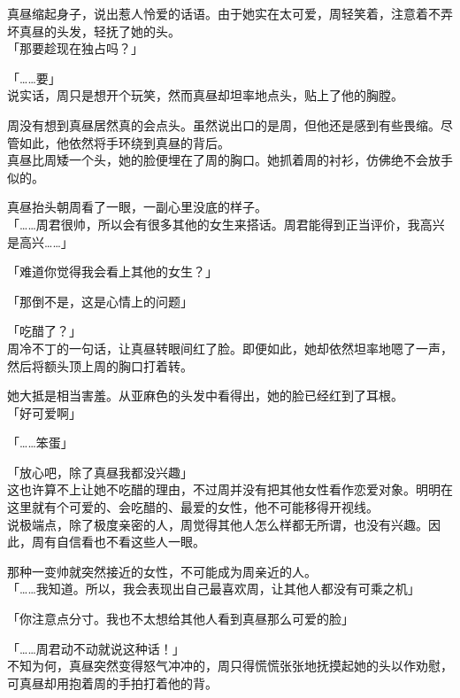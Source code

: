 真昼缩起身子，说出惹人怜爱的话语。由于她实在太可爱，周轻笑着，注意着不弄坏真昼的头发，轻抚了她的头。\\

「那要趁现在独占吗？」

「……要」\\

说实话，周只是想开个玩笑，然而真昼却坦率地点头，贴上了他的胸膛。

周没有想到真昼居然真的会点头。虽然说出口的是周，但他还是感到有些畏缩。尽管如此，他依然将手环绕到真昼的背后。\\

真昼比周矮一个头，她的脸便埋在了周的胸口。她抓着周的衬衫，仿佛绝不会放手似的。

真昼抬头朝周看了一眼，一副心里没底的样子。\\

「……周君很帅，所以会有很多其他的女生来搭话。周君能得到正当评价，我高兴是高兴……」

「难道你觉得我会看上其他的女生？」

「那倒不是，这是心情上的问题」

「吃醋了？」\\

周冷不丁的一句话，让真昼转眼间红了脸。即便如此，她却依然坦率地嗯了一声，然后将额头顶上周的胸口打着转。

她大抵是相当害羞。从亚麻色的头发中看得出，她的脸已经红到了耳根。\\

「好可爱啊」

「……笨蛋」

「放心吧，除了真昼我都没兴趣」\\

这也许算不上让她不吃醋的理由，不过周并没有把其他女性看作恋爱对象。明明在这里就有个可爱的、会吃醋的、最爱的女性，他不可能移得开视线。\\

说极端点，除了极度亲密的人，周觉得其他人怎么样都无所谓，也没有兴趣。因此，周有自信看也不看这些人一眼。

那种一变帅就突然接近的女性，不可能成为周亲近的人。\\

「……我知道。所以，我会表现出自己最喜欢周，让其他人都没有可乘之机」

「你注意点分寸。我也不太想给其他人看到真昼那么可爱的脸」

「……周君动不动就说这种话！」\\

不知为何，真昼突然变得怒气冲冲的，周只得慌慌张张地抚摸起她的头以作劝慰，可真昼却用抱着周的手拍打着他的背。\\

